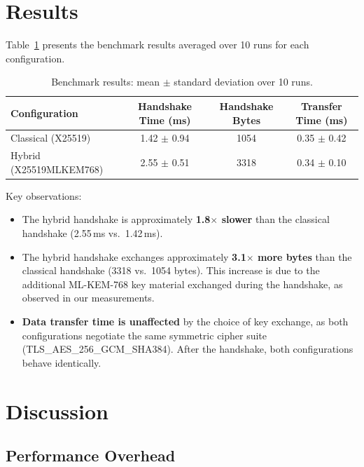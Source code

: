 \documentclass[11pt,a4paper]{article}
\begin{document}
\section{Results}

Table~\ref{tab:results} presents the benchmark results averaged over 10 runs for each configuration.

\begin{table}[h]
\centering
\begin{tabular}{lccc}
\toprule
\textbf{Configuration} & \textbf{Handshake Time (ms)} & \textbf{Handshake Bytes} & \textbf{Transfer Time (ms)} \\
\midrule
Classical (X25519)       & 1.42 $\pm$ 0.94 & 1054  & 0.35 $\pm$ 0.42 \\
Hybrid (X25519MLKEM768)  & 2.55 $\pm$ 0.51 & 3318  & 0.34 $\pm$ 0.10 \\
\bottomrule
\end{tabular}
\caption{Benchmark results: mean $\pm$ standard deviation over 10 runs.}
\label{tab:results}
\end{table}

\noindent Key observations:

\begin{itemize}
    \item The hybrid handshake is approximately \textbf{1.8$\times$ slower} than the classical handshake (2.55\,ms vs.\ 1.42\,ms).
    \item The hybrid handshake exchanges approximately \textbf{3.1$\times$ more bytes} than the classical handshake (3318 vs.\ 1054 bytes). This increase is due to the additional ML-KEM-768 key material exchanged during the handshake, as observed in our measurements.
    \item \textbf{Data transfer time is unaffected} by the choice of key exchange, as both configurations negotiate the same symmetric cipher suite (TLS\_AES\_256\_GCM\_SHA384). After the handshake, both configurations behave identically.
\end{itemize}

\section{Discussion}

\subsection{Performance Overhead}
\end{document}
